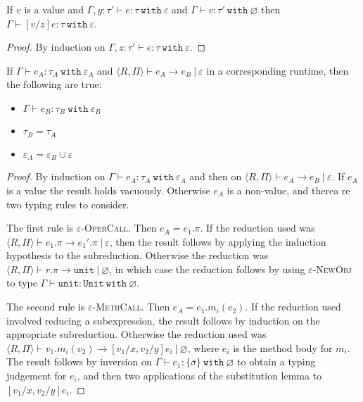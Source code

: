 \documentclass[a4paper,UKenglish]{lipics-v2016}
\newcommand{\kw}[1]{\mathtt{ #1 }~}
\newcommand{\kwa}[1]{\mathtt{ #1 }}
\newcommand{\rctx}[0]{ \langle R, \Pi \rangle }
\begin{document}
\begin{lemma}
If $v$ is a value and $\Gamma, y: \tau' \vdash e: \tau ~\kw{with} \varepsilon$ and $\Gamma \vdash v: \tau'~\kw{with} \varnothing$ then $\Gamma \vdash [v/z]e : \tau~\kw{with} \varepsilon$.
\end{lemma}

\begin{proof}
By induction on $\Gamma, z: \tau' \vdash e: \tau~\kw{with} \varepsilon$.
\end{proof}

\begin{theorem}
If $\Gamma \vdash e_A: \tau_A~\kw{with} \varepsilon_A$ and $\rctx \vdash e_A \longrightarrow e_B~|~\varepsilon$ in a corresponding runtime, then the following are true:

\begin{itemize}
	\item $\Gamma \vdash e_B: \tau_B~\kw{with} \varepsilon_B$
	\item $\tau_B = \tau_A$
	\item $\varepsilon_A = \varepsilon_B \cup \varepsilon$
\end{itemize}

\end{theorem}

\begin{proof}

By induction on $\Gamma \vdash e_A: \tau_A~\kw{with} \varepsilon_A$ and then on $\rctx \vdash e_A \longrightarrow e_B~|~\varepsilon$. If $e_A$ is a value the result holds vacuously. Otherwise $e_A$ is a non-value, and therea re two typing rules to consider.

The first rule is \textsc{$\varepsilon$-OperCall}. Then $e_A = e_1.\pi$. If the reduction used was $\rctx \vdash e_1.\pi \longrightarrow e_1'.\pi~|~\varepsilon$, then the result follows by applying the induction hypothesis to the subreduction. Otherwise the reduction was $\rctx \vdash r.\pi \longrightarrow \kwa{unit}~|~\varnothing$, in which case the reduction follows by using \textsc{$\varepsilon$-NewObj} to type $\Gamma \vdash \kwa{unit} : \kw{Unit} \kw{with} \varnothing$.

The second rule is \textsc{$\varepsilon$-MethCall}. Then $e_A = e_1.m_i(e_2)$. If the reduction used involved reducing a subexpression, the result follows by induction on the appropriate subreduction. Otherwise the reduction used was $\rctx \vdash v_1.m_i(v_2) \longrightarrow [v_1/x, v_2/y]e_i~|~\varnothing$, where $e_i$ is the method body for $m_i$. The result follows by inversion on $\Gamma \vdash e_1: \{ \bar \sigma \}~\kw{with} \varnothing$ to obtain a typing judgement for $e_i$, and then two applications of the substitution lemma to $[v_1/x, v_2/y]e_i$.

\end{proof}
\end{document}
